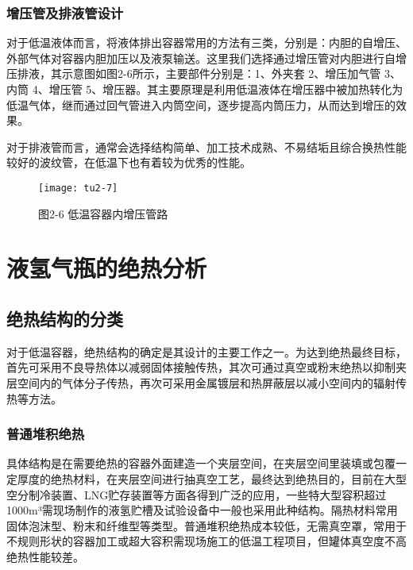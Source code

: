 \documentclass[UTF8,a4paper]{ctexart}
\newcommand{\upcite}[1]{\textsuperscript{\textsuperscript{\cite{#1}}}}
\begin{document}
	\subsubsection{增压管及排液管设计}
	对于低温液体而言，将液体排出容器常用的方法有三类，分别是：内胆的自增压、外部气体对容器内胆加压以及液泵输送。这里我们选择通过增压管对内胆进行自增压排液，其示意图如图2-6所示，主要部件分别是：1、外夹套 2、增压加气管 3、内筒 4、增压管 5、增压器。其主要原理是利用低温液体在增压器中被加热转化为低温气体，继而通过回气管进入内筒空间，逐步提高内筒压力，从而达到增压的效果\upcite{ref14}。
	
	对于排液管而言，通常会选择结构简单、加工技术成熟、不易结垢且综合换热性能较好的波纹管，在低温下也有着较为优秀的性能。
	
	\begin{figure}[H]
		\centering
		\texttt{[image: tu2-7]}
		\caption*{图2-6 低温容器内增压管路}
		\label{fig:tu2-6}
	\end{figure}
	
	\section{液氢气瓶的绝热分析}
	\subsection{绝热结构的分类}
	对于低温容器，绝热结构的确定是其设计的主要工作之一。为达到绝热最终目标，首先可采用不良导热体以减弱固体接触传热，其次可通过真空或粉末绝热以抑制夹层空间内的气体分子传热，再次可采用金属镀层和热屏蔽层以减小空间内的辐射传热等方法。
	\subsubsection{普通堆积绝热}
	具体结构是在需要绝热的容器外面建造一个夹层空间，在夹层空间里装填或包覆一定厚度的绝热材料，在夹层空间进行抽真空工艺，最终达到绝热目的，目前在大型空分制冷装置、LNG贮存装置等方面各得到广泛的应用，一些特大型容积超过1000m³需现场制作的液氢贮槽及试验设备中一般也采用此种结构。隔热材料常用固体泡沫型、粉末和纤维型等类型。普通堆积绝热成本较低，无需真空罩，常用于不规则形状的容器加工或超大容积需现场施工的低温工程项目，但罐体真空度不高绝热性能较差。
\end{document}
